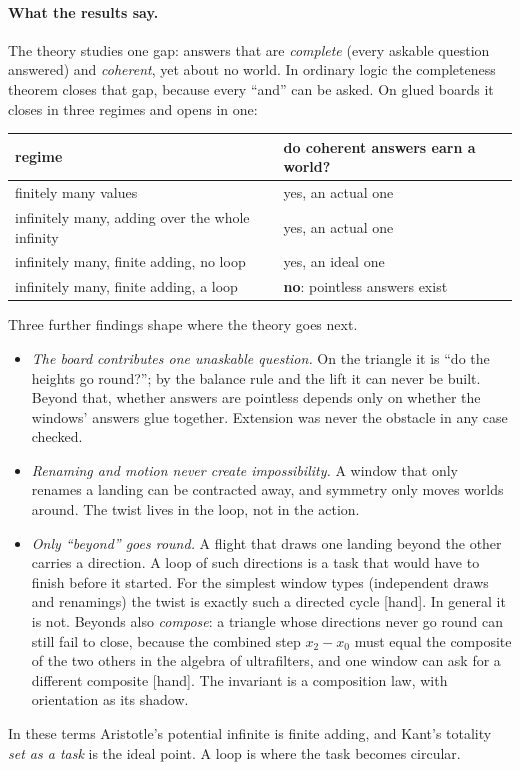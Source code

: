 \documentclass[11pt]{article}
\theoremstyle{plain}
\theoremstyle{definition}
\newcommand{\st}[1]{\textsf{\small[#1]}}
\begin{document}
\paragraph{What the results say.} The theory studies one gap: answers that are
\emph{complete} (every askable question answered) and \emph{coherent}, yet about no
world. In ordinary logic the completeness theorem closes that gap, because every
``and'' can be asked. On glued boards it closes in three regimes and opens in one:
\begin{center}\small
\begin{tabular}{|>{\raggedright\arraybackslash}p{6.2cm}|>{\raggedright\arraybackslash}p{5.6cm}|}
\hline
\textbf{regime} & \textbf{do coherent answers earn a world?}\\\hline
finitely many values & yes, an actual one\\
infinitely many, adding over the whole infinity & yes, an actual one\\
infinitely many, finite adding, no loop & yes, an ideal one\\
infinitely many, finite adding, a loop & \textbf{no}: pointless answers exist\\\hline
\end{tabular}
\end{center}
Three further findings shape where the theory goes next.
\begin{itemize}[nosep]
  \item \emph{The board contributes one unaskable question.} On the triangle it
    is ``do the heights go round?''; by the balance rule and the lift it can
    never be built. Beyond that, whether answers are pointless depends only on
    whether the windows' answers glue together. Extension was never the
    obstacle in any case checked.
  \item \emph{Renaming and motion never create impossibility.} A window that
    only renames a landing can be contracted away, and symmetry only moves
    worlds around. The twist lives in the loop, not in the action.
  \item \emph{Only ``beyond'' goes round.} A flight that draws one landing
    beyond the other carries a direction. A loop of such directions is a task
    that would have to finish before it started. For the simplest window types
    (independent draws and renamings) the twist is exactly such a directed cycle
    \st{hand}. In general it is not. Beyonds also \emph{compose}: a triangle
    whose directions never go round can still fail to close, because the
    combined step $x_2-x_0$ must equal the composite of the two others in the
    algebra of ultrafilters, and one window can ask for a different composite
    \st{hand}. The invariant is a composition law, with orientation as its
    shadow.
\end{itemize}
In these terms Aristotle's potential infinite is finite adding, and Kant's
totality \emph{set as a task} is the ideal point. A loop is where the task
becomes circular.
\end{document}
